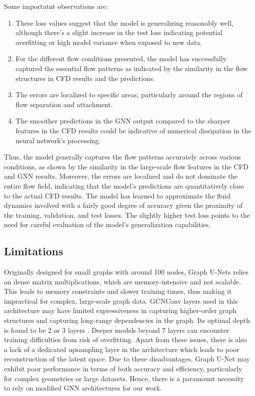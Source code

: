 Some importatnt observations are: 
\begin{enumerate}
    \item  These loss values suggest that the model is generalizing reasonably well, although there's a slight increase in the test loss indicating potential overfitting or high model variance when exposed to new data.
    \item For the different flow conditions presented, the model has successfully captured the essential flow patterns as indicated by the similarity in the flow structures in CFD results and the predictions.
    \item The errors are localized to specific areas, particularly around the regions of flow separation and attachment.
    \item The smoother predictions in the GNN output compared to the sharper features in the CFD results could be indicative of numerical dissipation in the neural network’s processing.
\end{enumerate}
Thus, the model generally captures the flow patterns accurately across various conditions, as shown by the similarity in the large-scale flow features in the CFD and GNN results. Moreover, the errors are localized and do not dominate the entire flow field, indicating that the model's predictions are quantitatively close to the actual CFD results. The model has learned to approximate the fluid dynamics involved with a fairly good degree of accuracy given the proximity of the training, validation, and test losses. The slightly higher test loss points to the need for careful evaluation of the model's generalization capabilities. 
\subsection{Limitations}
Originally designed for small graphs with around 100 nodes, Graph U-Nets relies on dense matrix multiplications, which are memory-intensive and not scalable. This leads to memory constraints and slower training times, thus making it impractical for complex, large-scale graph data. GCNConv layers used in this architecture may have limited expressiveness in capturing higher-order graph structures and capturing long-range dependencies in the graph. Its optimal depth is found to be 2 or 3 layers \cite{kipf}. Deeper models beyond 7 layers can encounter training difficulties from risk of overfitting. Apart from these issues, there is also a lack of a dedicated upsampling layer in the architecture which leads to poor reconstruction of the latent space. Due to these disadvantages, Graph U-Net may exhibit poor performance in terms of both accuracy and efficiency, particularly for complex geometries or large datasets. Hence, there is a paramount necessity to rely on modified GNN architectures for our work.

